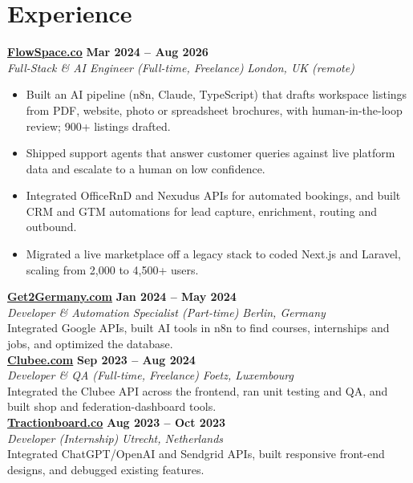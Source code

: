 \documentclass[a4paper,10pt]{article}
\newcommand{\role}[4]{%
 \textbf{#1} \hfill \textbf{#2}\\[1pt]%
 \textit{#3} \hfill \textit{#4}\\[2pt]%
}
\begin{document}
\section{Experience}

\role{\href{https://flowspace.co}{FlowSpace.co}}{Mar 2024 -- Aug 2026}{Full-Stack \& AI Engineer (Full-time, Freelance)}{London, UK (remote)}
\begin{itemize}
 \item Built an AI pipeline (n8n, Claude, TypeScript) that drafts workspace listings from PDF, website, photo or spreadsheet brochures, with human-in-the-loop review; 900+ listings drafted.
 \item Shipped support agents that answer customer queries against live platform data and escalate to a human on low confidence.
 \item Integrated OfficeRnD and Nexudus APIs for automated bookings, and built CRM and GTM automations for lead capture, enrichment, routing and outbound.
 \item Migrated a live marketplace off a legacy stack to coded Next.js and Laravel, scaling from 2,000 to 4,500+ users.
\end{itemize}

\role{\href{https://get2germany.com}{Get2Germany.com}}{Jan 2024 -- May 2024}{Developer \& Automation Specialist (Part-time)}{Berlin, Germany}
Integrated Google APIs, built AI tools in n8n to find courses, internships and jobs, and optimized the database.\\[1pt]

\role{\href{https://clubee.com}{Clubee.com}}{Sep 2023 -- Aug 2024}{Developer \& QA (Full-time, Freelance)}{Foetz, Luxembourg}
Integrated the Clubee API across the frontend, ran unit testing and QA, and built shop and federation-dashboard tools.\\[1pt]

\role{\href{https://tractionboard.co}{Tractionboard.co}}{Aug 2023 -- Oct 2023}{Developer (Internship)}{Utrecht, Netherlands}
Integrated ChatGPT/OpenAI and Sendgrid APIs, built responsive front-end designs, and debugged existing features.

\end{document}
